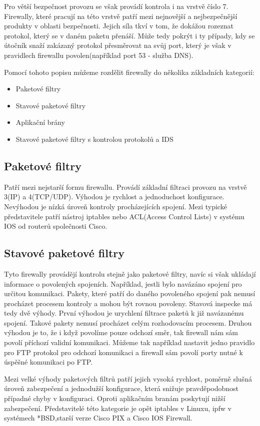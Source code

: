 \documentclass[11pt,a4paper]{article}
\begin{document}
Pro větší bezpečnost provozu se však provádí kontrola i na vrstvě číslo 7. Firewally, které pracují na této vrstvě patří mezi nejnovější a nejbezpečnější produkty v oblasti bezpečnosti. Jejich síla tkví v tom, že dokážou rozeznat protokol, který se v daném paketu přenáší. Může tedy pokrýt i ty případy, kdy se útočník snaží zakázaný protokol přesměrovat na svůj port, který je však v pravidlech firewallu povolen(například port 53 - služba DNS).

Pomocí tohoto popisu můžeme rozdělit firewally do několika základních kategorií:
\begin{itemize}
	\item Paketové filtry
	\item Stavové paketové filtry
	\item Aplikační brány
	\item Stavové paketové filtry s kontrolou protokolů a IDS
\end{itemize} 

\subsection{Paketové filtry}
Patří mezi nejstarší formu firewallu. Provádí základní filtraci provozu na vrstvě 3(IP) a 4(TCP/UDP). Výhodou je rychlost a jednoduchost konfigurace. Nevýhodou je nízká úroveň kontroly procházejících spojení. Mezi typické představitele patří nástroj iptables nebo ACL(Access Control Lists) v systému IOS od routerů společnosti Cisco.

\subsection{Stavové paketové filtry}
Tyto firewally provádějí kontrolu stejně jako paketové filtry, navíc si však ukládají informace o povolených spojeních. Například, jestli bylo navázáno spojení pro určitou komunikaci. Pakety, které patří do daného povoleného spojení pak nemusí procházet procesem kontroly a mohou být rovnou povoleny. Stavová inspecke má tedy dvě výhody. První výhodou je urychlení filtrace paketů k již navázanému spojení. Takové pakety nemusí procházet celým rozhodovacím procesem. Druhou výhodou je to, že i když povolíme pouze odchozí směr, tak firewall nám sám povolí příchozí validní komunikaci. Můžeme tak například nastavit jedno pravidlo pro FTP protokol pro odchozí komunikaci a firewall sám povolí porty nutné k úspěšné komunikaci po FTP.

Mezi velké výhody paketových filtrů patří jejich vysoká rychlost, poměrně slušná úroveň zabezpečení a jednodužší konfigurace, která snižuje pravděpodobnost případné chyby v konfiguraci. Oproti aplikačním branám poskytují nižší zabezpečení. Představitelé této kategorie je opět iptables v Linuxu, ipfw v systémech *BSD,starší verze Cisco PIX a Cisco IOS Firewall.
\end{document}
